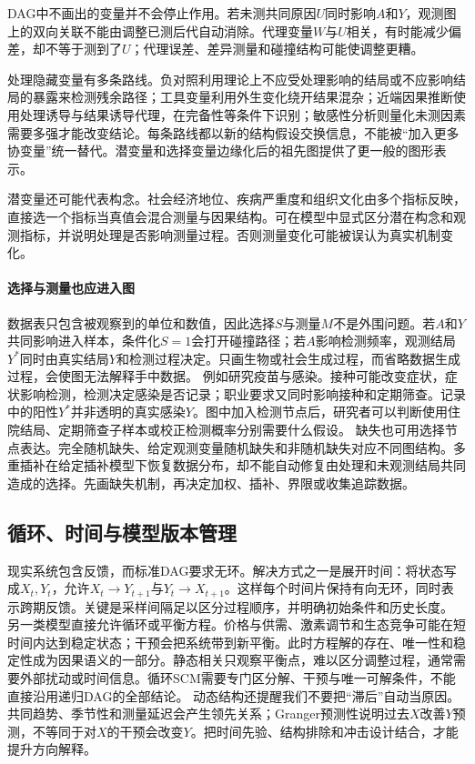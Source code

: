 DAG中不画出的变量并不会停止作用。若未测共同原因$U$同时影响$A$和$Y$，观测图上的双向关联不能由调整已测后代自动消除。代理变量$W$与$U$相关，有时能减少偏差，却不等于测到了$U$；代理误差、差异测量和碰撞结构可能使调整更糟。

处理隐藏变量有多条路线。负对照利用理论上不应受处理影响的结局或不应影响结局的暴露来检测残余路径；工具变量利用外生变化绕开结果混杂；近端因果推断使用处理诱导与结果诱导代理，在完备性等条件下识别；敏感性分析则量化未测因素需要多强才能改变结论。每条路线都以新的结构假设交换信息，不能被“加入更多协变量”统一替代。潜变量和选择变量边缘化后的祖先图提供了更一般的图形表示\parencite{richardsonspirtes2002}。

潜变量还可能代表构念。社会经济地位、疾病严重度和组织文化由多个指标反映，直接选一个指标当真值会混合测量与因果结构。可在模型中显式区分潜在构念和观测指标，并说明处理是否影响测量过程。否则测量变化可能被误认为真实机制变化。

\paragraph{选择与测量也应进入图}

数据表只包含被观察到的单位和数值，因此选择$S$与测量$M$不是外围问题。若$A$和$Y$共同影响进入样本，条件化$S=1$会打开碰撞路径；若$A$影响检测频率，观测结局$Y^*$同时由真实结局$Y$和检测过程决定。只画生物或社会生成过程，而省略数据生成过程，会使图无法解释手中数据。
例如研究疫苗与感染。接种可能改变症状，症状影响检测，检测决定感染是否记录；职业要求又同时影响接种和定期筛查。记录中的阳性$Y^*$并非透明的真实感染$Y$。图中加入检测节点后，研究者可以判断使用住院结局、定期筛查子样本或校正检测概率分别需要什么假设。
缺失也可用选择节点表达。完全随机缺失、给定观测变量随机缺失和非随机缺失对应不同图结构。多重插补在给定插补模型下恢复数据分布，却不能自动修复由处理和未观测结局共同造成的选择。先画缺失机制，再决定加权、插补、界限或收集追踪数据。

\subsection{循环、时间与模型版本管理}

现实系统包含反馈，而标准DAG要求无环。解决方式之一是展开时间：将状态写成$X_t,Y_t$，允许$X_t\rightarrow Y_{t+1}$与$Y_t\rightarrow X_{t+1}$。这样每个时间片保持有向无环，同时表示跨期反馈。关键是采样间隔足以区分过程顺序，并明确初始条件和历史长度。
另一类模型直接允许循环或平衡方程。价格与供需、激素调节和生态竞争可能在短时间内达到稳定状态；干预会把系统带到新平衡。此时方程解的存在、唯一性和稳定性成为因果语义的一部分。静态相关只观察平衡点，难以区分调整过程，通常需要外部扰动或时间信息。循环SCM需要专门区分解、干预与唯一可解条件，不能直接沿用递归DAG的全部结论\parencite{bongers2021}。
动态结构还提醒我们不要把“滞后”自动当原因。共同趋势、季节性和测量延迟会产生领先关系；Granger预测性说明过去$X$改善$Y$预测，不等同于对$X$的干预会改变$Y$。把时间先验、结构排除和冲击设计结合，才能提升方向解释。

